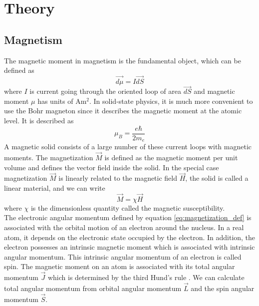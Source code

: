 \section{Theory}\label{Theory}
\subsection{Magnetism}\label{Magnetism}
The magnetic moment in magnetism is the fundamental object, which can be defined as \cite{blundel}
\begin{equation}\label{eq:magnetization_def}
    \overrightarrow{d\mu} = I \overrightarrow{dS}
\end{equation}
where $I$ is current going through the oriented loop of area $\overrightarrow{dS}$ and magnetic moment $\mu$ has units of Am$^{2}$. 
In solid-state physics, it is much more convenient to use the Bohr magneton since it describes the magnetic moment at the atomic level. 
It is described as  
\begin{equation}
    \mu_B = \frac{e\hbar}{2m_e}
\end{equation}
A magnetic solid consists of a large number of these current loops with magnetic moments. 
The magnetization $\overrightarrow{M}$ is defined as the magnetic moment per unit volume and defines the vector field inside the solid. 
In the special case  magnetization $\overrightarrow{M}$ is linearly related to the magnetic field $\overrightarrow{H}$, 
the solid is called a linear material, and we can write 
\begin{equation}\label{eq:linear_magnetization}
    \overrightarrow{M} = \chi \overrightarrow{H}
\end{equation}
where $\chi$ is the dimensionless quantity called the magnetic susceptibility. \\
The electronic angular momentum  defined by equation \ref{eq:magnetization_def} is associated with the orbital motion of an electron around the nucleus. 
In a real atom, it depends on the electronic state occupied by the electron. 
In addition, the electron possesses an intrinsic magnetic moment which is associated with intrinsic angular momentum. 
This intrinsic angular momentum of an electron is called spin. 
The magnetic moment on an atom is associated with its total angular momentum $\overrightarrow{J}$ which is determined by the third Hund's rule \cite{Magnetism_total_momentum}. 
We can calculate total angular momentum from orbital angular momentum $\overrightarrow{L}$ and the spin angular momentum $\overrightarrow{S}$.